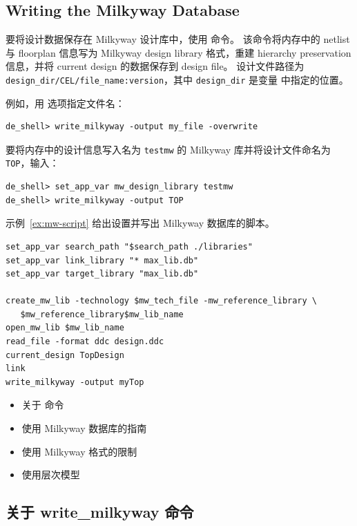\subsection*{Writing the Milkyway Database}

要将设计数据保存在 Milkyway 设计库中，使用  命令。
该命令将内存中的 netlist 与 floorplan 信息写为 Milkyway design library 格式，重建 hierarchy preservation 信息，并将 current design 的数据保存到 design file。
设计文件路径为 \texttt{design\_dir/CEL/file\_name:version}，其中 \texttt{design\_dir} 是变量  中指定的位置。

例如，用  选项指定文件名：
\begin{lstlisting}
de_shell> write_milkyway -output my_file -overwrite
\end{lstlisting}

要将内存中的设计信息写入名为 \texttt{testmw} 的 Milkyway 库并将设计文件命名为 \texttt{TOP}，输入：
\begin{lstlisting}
de_shell> set_app_var mw_design_library testmw
de_shell> write_milkyway -output TOP
\end{lstlisting}

示例~\ref{ex:mw-script} 给出设置并写出 Milkyway 数据库的脚本。

\begin{lstlisting}[caption={设置并写出 Milkyway 数据库的脚本},label=ex:mw-script]
set_app_var search_path "$search_path ./libraries"
set_app_var link_library "* max_lib.db"
set_app_var target_library "max_lib.db"

create_mw_lib -technology $mw_tech_file -mw_reference_library \
   $mw_reference_library$mw_lib_name
open_mw_lib $mw_lib_name
read_file -format ddc design.ddc
current_design TopDesign
link
write_milkyway -output myTop
\end{lstlisting}

\begin{seeAlsoBox}
\begin{itemize}
  \item 关于  命令
  \item 使用 Milkyway 数据库的指南
  \item 使用 Milkyway 格式的限制
  \item 使用层次模型
\end{itemize}
\end{seeAlsoBox}

\subsection{关于 write\_milkyway 命令}
